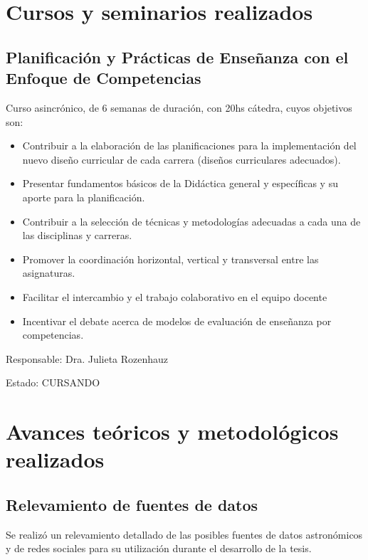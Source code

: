 \documentclass[
	11pt,oneside,a4paper,
	fleqn,
	article
]{memoir}
\begin{document}


\newpage

\tableofcontents

\section {Cursos y seminarios realizados}

\subsection{Planificación y Prácticas de Enseñanza con el Enfoque de Competencias}

Curso asincrónico, de 6 semanas de duración, con 20hs cátedra, cuyos objetivos son:

\begin{itemize}
	\item Contribuir a la elaboración de las planificaciones para la implementación del nuevo diseño curricular de cada carrera (diseños curriculares adecuados).
	\item Presentar fundamentos básicos de la Didáctica general y específicas y su aporte para la planificación.
	\item Contribuir a la selección de técnicas y metodologías adecuadas a cada una de las disciplinas y carreras.
	\item Promover la coordinación horizontal, vertical y transversal entre las asignaturas.
	\item Facilitar el intercambio y el trabajo colaborativo en el equipo docente
	\item Incentivar el debate acerca de modelos de evaluación de enseñanza por competencias.
\end{itemize}

Responsable: Dra. Julieta Rozenhauz

Estado: CURSANDO

\section {Avances teóricos y metodológicos realizados}

\subsection{Relevamiento de fuentes de datos}

Se realizó un relevamiento detallado de las posibles fuentes de datos astronómicos y de redes sociales para su utilización durante el desarrollo de la tesis.
\end{document}

